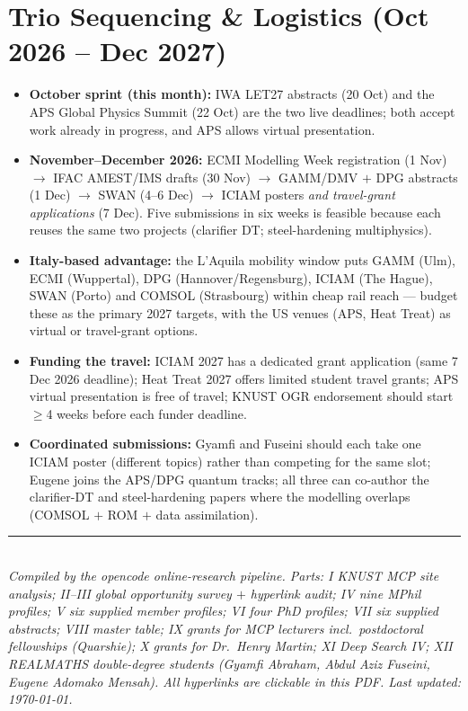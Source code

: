 \documentclass[11pt,a4paper]{article}
\begin{document}
\section{Trio Sequencing \& Logistics (Oct 2026 -- Dec 2027)}

\begin{itemize}[leftmargin=1.4em]
  \item \textbf{October sprint (this month):} IWA LET27 abstracts (20 Oct) and the APS Global Physics Summit (22 Oct) are the two live deadlines; both accept work already in progress, and APS allows virtual presentation.
  \item \textbf{November--December 2026:} ECMI Modelling Week registration (1 Nov) $\rightarrow$ IFAC AMEST/IMS drafts (30 Nov) $\rightarrow$ GAMM/DMV $+$ DPG abstracts (1 Dec) $\rightarrow$ SWAN (4--6 Dec) $\rightarrow$ ICIAM posters \emph{and travel-grant applications} (7 Dec). Five submissions in six weeks is feasible because each reuses the same two projects (clarifier DT; steel-hardening multiphysics).
  \item \textbf{Italy-based advantage:} the L'Aquila mobility window puts GAMM (Ulm), ECMI (Wuppertal), DPG (Hannover/Regensburg), ICIAM (The Hague), SWAN (Porto) and COMSOL (Strasbourg) within cheap rail reach --- budget these as the primary 2027 targets, with the US venues (APS, Heat Treat) as virtual or travel-grant options.
  \item \textbf{Funding the travel:} ICIAM 2027 has a dedicated grant application (same 7 Dec 2026 deadline); Heat Treat 2027 offers limited student travel grants; APS virtual presentation is free of travel; KNUST OGR endorsement should start $\geq$4 weeks before each funder deadline.
  \item \textbf{Coordinated submissions:} Gyamfi and Fuseini should each take one ICIAM poster (different topics) rather than competing for the same slot; Eugene joins the APS/DPG quantum tracks; all three can co-author the clarifier-DT and steel-hardening papers where the modelling overlaps (COMSOL $+$ ROM $+$ data assimilation).
\end{itemize}

\bigskip
\noindent\rule{\textwidth}{0.4pt}\\
\small\emph{Compiled by the opencode online-research pipeline. Parts: I KNUST MCP site analysis; II--III global opportunity survey $+$ hyperlink audit; IV nine MPhil profiles; V six supplied member profiles; VI four PhD profiles; VII six supplied abstracts; VIII master table; IX grants for MCP lecturers incl.\ postdoctoral fellowships (Quarshie); X grants for Dr.\ Henry Martin; XI Deep Search IV; XII REALMATHS double-degree students (Gyamfi Abraham, Abdul Aziz Fuseini, Eugene Adomako Mensah). All hyperlinks are clickable in this PDF. Last updated: \today.}
\end{document}
